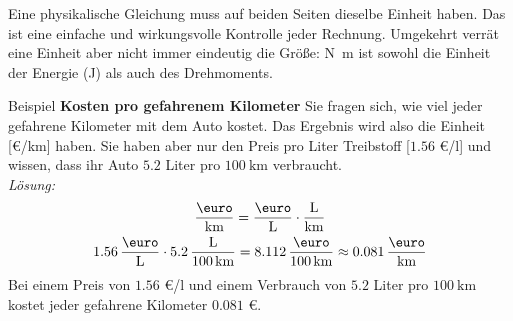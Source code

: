 \begin{rememberbox}[]{}
    Eine physikalische Gleichung muss auf beiden Seiten dieselbe Einheit haben. Das ist eine einfache und wirkungsvolle Kontrolle jeder Rechnung. Umgekehrt verrät eine Einheit aber nicht immer eindeutig die Größe: \si{\newton\meter} ist sowohl die Einheit der Energie (\si{\joule}) als auch des Drehmoments.
\end{rememberbox}

\begin{examplebox}[]{Beispiel}
    \textbf{Kosten pro gefahrenem Kilometer}
    Sie fragen sich, wie viel jeder gefahrene Kilometer mit dem Auto kostet. Das Ergebnis wird also die Einheit [€/km] haben. Sie haben aber nur den Preis pro Liter Treibstoff [$\num{1.56}$ €/l] und wissen, dass ihr Auto $\num{5.2}$ Liter pro $\SI{100}{\kilo\meter}$ verbraucht. \\
    
    \textit{Lösung:}
    \begin{gather*}
        \frac{\sEUR}{\si{\kilo\meter}} = \frac{\sEUR}{\si{\liter}} \cdot \frac{\si{\liter}}{\si{\kilo\meter}} \\
        \num{1.56}\,\frac{\sEUR}{\si{\liter}} \cdot \num{5.2}\,\frac{\si{\liter}}{\SI{100}{\kilo\meter}} = \num{8.112}\,\frac{\sEUR}{\SI{100}{\kilo\meter}} \approx \num{0.081}\,\frac{\sEUR}{\si{\kilo\meter}}
    \end{gather*}
    Bei einem Preis von $\num{1.56}$ €/l und einem Verbrauch von $\num{5.2}$ Liter pro $\SI{100}{\kilo\meter}$ kostet jeder gefahrene Kilometer $\num{0.081}$ €.
\end{examplebox}

